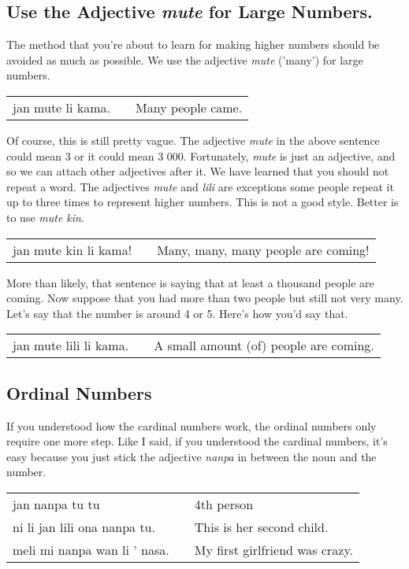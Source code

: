 \subsection*{Use the Adjective \textit{mute} for Large Numbers.}
The method that you're about to learn for making higher numbers should be avoided as much as possible.
We use the adjective \textit{mute} ('many') for large numbers.

\begin{supertabular}{p{5,5cm}|ll}
    jan mute li kama. &  & Many people came. \\
\end{supertabular}

Of course, this is still pretty vague.
The adjective \textit{mute} in the above sentence could mean 3 or it could mean 3 000.
Fortunately, \textit{mute} is just an adjective, and so we can attach other adjectives after it.
We have learned that you should not repeat a word.
The adjectives \textit{mute} and \textit{lili} are exceptions some people repeat it up to three times to represent higher numbers.
This is not a good style.
Better is to use \textit{mute kin}.

\begin{supertabular}{p{5,5cm}|ll}
    jan mute kin li kama! &  & Many, many, many people are coming! \\
\end{supertabular}

More than likely, that sentence is saying that at least a thousand people are coming.
Now suppose that you had more than two people but still not very many.
Let's say that the number is around 4 or 5. Here's how you'd say that.

\begin{supertabular}{p{5,5cm}|ll}
    jan mute lili li kama. &  & A small amount (of) people are coming. \\
\end{supertabular}

\subsection*{Ordinal Numbers}
If you understood how the cardinal numbers work, the ordinal numbers only require one more step.
Like I said, if you understood the cardinal numbers, it's easy because you just stick the adjective \textit{nanpa} in between the noun and the number.

\begin{supertabular}{p{5,5cm}|ll}
    jan nanpa tu tu              &  & 4th person                     \\
    ni li jan lili ona nanpa tu. &  & This is her second child.      \\
    meli mi nanpa wan li ' nasa. &  & My first girlfriend was crazy. \\
\end{supertabular}

